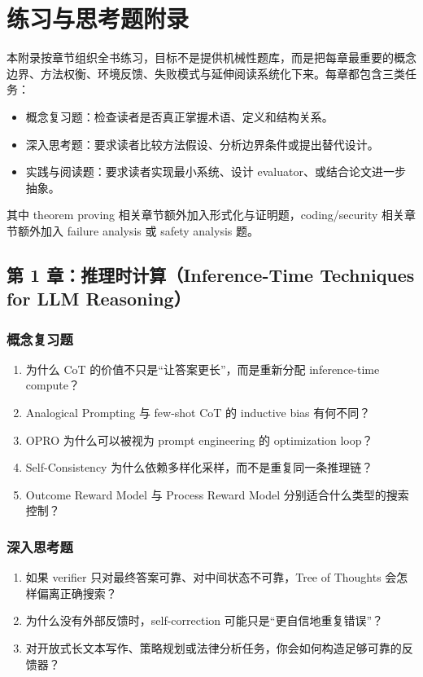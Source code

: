 \chapter{练习与思考题附录}

本附录按章节组织全书练习，目标不是提供机械性题库，而是把每章最重要的概念边界、方法权衡、环境反馈、失败模式与延伸阅读系统化下来。每章都包含三类任务：
\begin{itemize}
\item 概念复习题：检查读者是否真正掌握术语、定义和结构关系。
\item 深入思考题：要求读者比较方法假设、分析边界条件或提出替代设计。
\item 实践与阅读题：要求读者实现最小系统、设计 evaluator、或结合论文进一步抽象。
\end{itemize}
其中 theorem proving 相关章节额外加入形式化与证明题，coding/security 相关章节额外加入 failure analysis 或 safety analysis 题。

\section{第 1 章：推理时计算（Inference-Time Techniques for LLM Reasoning）}

\subsection*{概念复习题}
\begin{enumerate}
\item 为什么 CoT 的价值不只是“让答案更长”，而是重新分配 inference-time compute？
\item Analogical Prompting 与 few-shot CoT 的 inductive bias 有何不同？
\item OPRO 为什么可以被视为 prompt engineering 的 optimization loop？
\item Self-Consistency 为什么依赖多样化采样，而不是重复同一条推理链？
\item Outcome Reward Model 与 Process Reward Model 分别适合什么类型的搜索控制？
\end{enumerate}

\subsection*{深入思考题}
\begin{enumerate}
\item 如果 verifier 只对最终答案可靠、对中间状态不可靠，Tree of Thoughts 会怎样偏离正确搜索？
\item 为什么没有外部反馈时，self-correction 可能只是“更自信地重复错误”？
\item 对开放式长文本写作、策略规划或法律分析任务，你会如何构造足够可靠的反馈器？
\end{enumerate}


